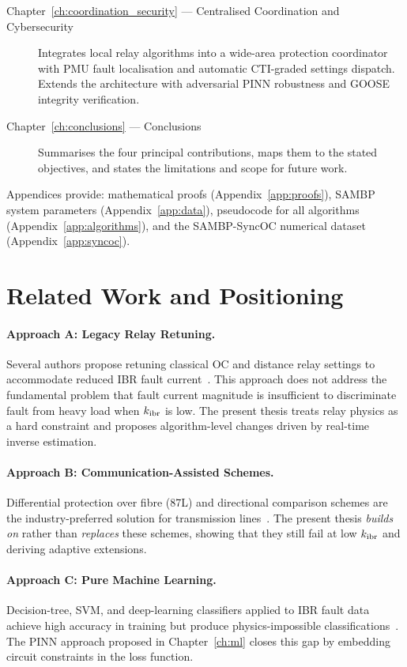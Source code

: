 \begin{description}
\item[Chapter~\ref{ch:coordination_security} --- Centralised Coordination and Cybersecurity]
  Integrates local relay algorithms into a wide-area protection coordinator
  with PMU fault localisation and automatic CTI-graded settings dispatch.
  Extends the architecture with adversarial PINN robustness and GOOSE
  integrity verification.

\item[Chapter~\ref{ch:conclusions} --- Conclusions]
  Summarises the four principal contributions, maps them to the stated
  objectives, and states the limitations and scope for future work.
\end{description}

Appendices provide: mathematical proofs (Appendix~\ref{app:proofs}),
SAMBP system parameters (Appendix~\ref{app:data}), pseudocode for all
algorithms (Appendix~\ref{app:algorithms}), and the SAMBP-SyncOC
numerical dataset (Appendix~\ref{app:syncoc}).

\section{Related Work and Positioning}
\label{sec:ch1_literature}

\paragraph{Approach A: Legacy Relay Retuning.}
Several authors propose retuning classical OC and distance relay settings
to accommodate reduced IBR fault current~\citep{Hooshyar2019, Sadeghi2021}.
This approach does not address the fundamental problem that fault current
magnitude is insufficient to discriminate fault from heavy load when $k_\mathrm{ibr}$
is low. The present thesis treats relay physics as a hard constraint
and proposes algorithm-level changes driven by real-time inverse estimation.

\paragraph{Approach B: Communication-Assisted Schemes.}
Differential protection over fibre (87L) and directional comparison schemes
are the industry-preferred solution for transmission lines~\citep{Gers2011, Zhang2020POTT}.
The present thesis \emph{builds on} rather than \emph{replaces} these schemes,
showing that they still fail at low $k_\mathrm{ibr}$ and deriving adaptive extensions.

\paragraph{Approach C: Pure Machine Learning.}
Decision-tree, SVM, and deep-learning classifiers applied to IBR fault data
achieve high accuracy in training but produce physics-impossible
classifications~\citep{Jamali2020, Liao2022DNN}. The PINN approach proposed
in Chapter~\ref{ch:ml} closes this gap by embedding circuit constraints in
the loss function.

